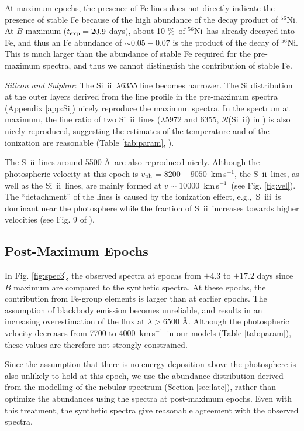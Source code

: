 \documentclass[usegraphicx,usenatbib]{mn2e}
\newcommand{\kms}{\mbox{\,km\,s$^{-1}$}}
\newcommand{\eg}{e.g.,\ }
\newcommand{\vph}{$v_{\rm ph}$}
\newcommand{\SiII}{Si~{\sc ii}}
\newcommand{\SII}{S~{\sc ii}}
\newcommand{\SIII}{S~{\sc iii}}
\newcommand{\Nifs}{$^{56}$Ni}
\newcommand{\texp}{t_{\rm exp}}
\begin{document}
At maximum epochs, the presence of Fe lines does not directly indicate the
presence of stable Fe because of the high abundance of the decay product of
\Nifs. At $B$ maximum ($\texp=20.9$ days), about 10 \%\ of \Nifs\ has already 
decayed into Fe, and thus an Fe abundance of $\sim 0.05 - 0.07$ is the product
of the decay of \Nifs. This is much larger than the abundance of stable Fe
required for the pre-maximum spectra, and thus we cannot distinguish the
contribution of stable Fe.

{\it Silicon and Sulphur}: The \SiII\ $\lambda$6355 line becomes narrower. The
Si distribution at the outer layers derived from the line profile in the 
pre-maximum spectra (Appendix \ref{app:Si}) nicely reproduce the maximum
spectra. In the spectrum at maximum, the line ratio of two \SiII\ lines 
($\lambda$5972 and 6355, $\mathcal{R}$(\SiII) in \citealt{nugent95}) is also
nicely reproduced, suggesting the estimates of the temperature and of the
ionization are reasonable (Table \ref{tab:param}, \citealt{hachinger08}).

The \SII\ lines around 5500 \AA\ are also reproduced nicely. Although the
photospheric velocity at this epoch is \vph $=8200 - 9050$ \kms, the \SII\
lines, as well as  the \SiII\ lines, are mainly formed at $v \sim 10000$ \kms\ 
(see Fig. \ref{fig:vel}). The ``detachment'' of the lines is caused by the
ionization effect, \eg \SIII\ is dominant near the photosphere while the
fraction of \SII\ increases towards higher velocities (see Fig. 9 of
\citealt{tanaka08Ia}).


\subsection{Post-Maximum Epochs}

In Fig. \ref{fig:spec3}, the observed spectra at epochs from $+4.3$ to $+17.2$
days since $B$ maximum are compared to the synthetic spectra. At these epochs,
the contribution from Fe-group elements is larger than at earlier epochs. The
assumption of blackbody emission becomes unreliable, and results in an
increasing overestimation of the flux at $\lambda > 6500$ \AA. Although the
photospheric velocity decreases from 7700 to 4000 \kms\ in our models (Table
\ref{tab:param}), these values are therefore not strongly constrained.

Since the assumption that there is no energy deposition above the photosphere is
also unlikely to hold at this epoch, we use the abundance distribution derived
from the modelling of the nebular spectrum (Section \ref{sec:late}), rather than
optimize the abundances using the spectra at post-maximum epochs.  Even with
this treatment, the synthetic spectra give reasonable agreement with the
observed spectra.
\end{document}
